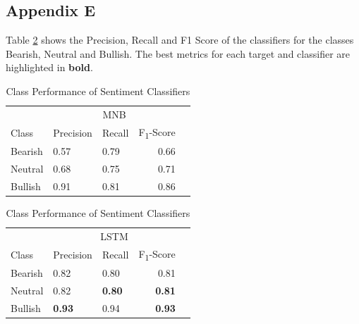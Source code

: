 \documentclass[11pt, a4paper]{article}
\begin{document}
\subsection{Appendix E}
Table \ref{tab:ClassPerformanceOfModels} shows the Precision, Recall and F1 Score of the classifiers
for the classes Bearish, Neutral and Bullish. The best metrics for each target and classifier
are highlighted in \textbf{bold}.

\label{appendix:classification_report_for_classes}

\begin{table}[!htb]
    \caption{Class Performance of Sentiment Classifiers}
    \label{tab:ClassPerformanceOfModels}
    \centering
    \small

    \begin{tabular}{lllrr}
        \toprule
                                        & \multicolumn{3}{c}{MNB} \\
                                        \cmidrule{2-4}
                            Class       & Precision     & Recall    & F\textsubscript{1}-Score \\
            \midrule
            \multirow{1}{*}{Bearish}       & 0.57          & 0.79      & 0.66                      \\
            \midrule
            \multirow{1}{*}{Neutral}       & 0.68          & 0.75      & 0.71                      \\
            \midrule
            \multirow{1}{*}{Bullish}       & 0.91          & 0.81      & 0.86                      \\
        \bottomrule
    \end{tabular}
    \begin{tabular}{lllrr}
                                        & \multicolumn{3}{c}{LSTM} \\
                                        \cmidrule{2-4}
                            Class       & Precision     & Recall    & F\textsubscript{1}-Score \\
            \midrule
            \multirow{1}{*}{Bearish}       & 0.82          & 0.80      & 0.81                      \\
            \midrule
            \multirow{1}{*}{Neutral}       & 0.82          & \textbf{0.80}      & \textbf{0.81}                      \\
            \midrule
            \multirow{1}{*}{Bullish}       & \textbf{0.93}          & 0.94      & \textbf{0.93}                      \\

\end{tabular}
\end{table}
\end{document}
